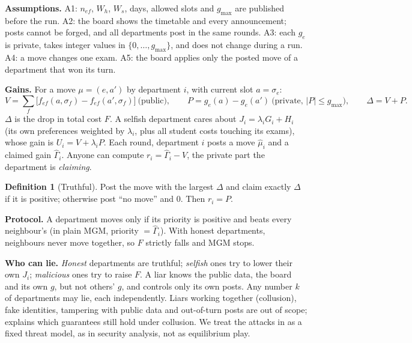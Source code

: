 \documentclass{article}
\theoremstyle{definition}
\newtheorem{definition}{Definition}
\newcommand{\1}{\mathbf{1}}
\newcommand{\gmax}{g_{\max}}
\begin{document}
\textbf{Assumptions.} A1: $n_{ef}$, $W_h$, $W_s$, days, allowed slots and $\gmax$ are published before the run. A2: the board shows the timetable and every announcement; posts cannot be forged, and all departments post in the same rounds. A3: each $g_e$ is private, takes integer values in $\{0,\dots,\gmax\}$, and does not change during a run. A4: a move changes one exam. A5: the board applies only the posted move of a department that won its turn.

\textbf{Gains.} For a move $\mu=(e,a')$ by department $i$, with current slot $a=\sigma_e$:
\begin{equation}
V=\textstyle\sum_{f}\big[f_{ef}(a,\sigma_f)-f_{ef}(a',\sigma_f)\big]\ \text{(public)},\qquad P=g_e(a)-g_e(a')\ \text{(private, } |P|\le\gmax),\qquad \Delta=V+P.
\label{eq:gain}
\end{equation}
$\Delta$ is the drop in total cost $F$. A selfish department cares about $J_i=\lambda_iG_i+H_i$ (its own preferences weighted by $\lambda_i$, plus all student costs touching its exams), whose gain is $U_i=V+\lambda_iP$. Each round, department $i$ posts a move $\hat\mu_i$ and a claimed gain $\hat\Gamma_i$. Anyone can compute $r_i=\hat\Gamma_i-V$, the private part the department is \emph{claiming}.

\begin{definition}[Truthful]
Post the move with the largest $\Delta$ and claim exactly $\Delta$ if it is positive; otherwise post ``no move'' and $0$. Then $r_i=P$.
\end{definition}

\textbf{Protocol.} A department moves only if its priority is positive and beats every neighbour's (in plain MGM, priority $=\hat\Gamma_i$). With honest departments, neighbours never move together, so $F$ strictly falls and MGM stops.

\textbf{Who can lie.} \emph{Honest} departments are truthful; \emph{selfish} ones try to lower their own $J_i$; \emph{malicious} ones try to raise $F$. A liar knows the public data, the board and its own $g$, but not others' $g$, and controls only its own posts. Any number $k$ of departments may lie, each independently. Liars working together (collusion), fake identities, tampering with public data and out-of-turn posts are out of scope;  explains which guarantees still hold under collusion. We treat the attacks in  as a fixed threat model, as in security analysis, not as equilibrium play.
\end{document}
